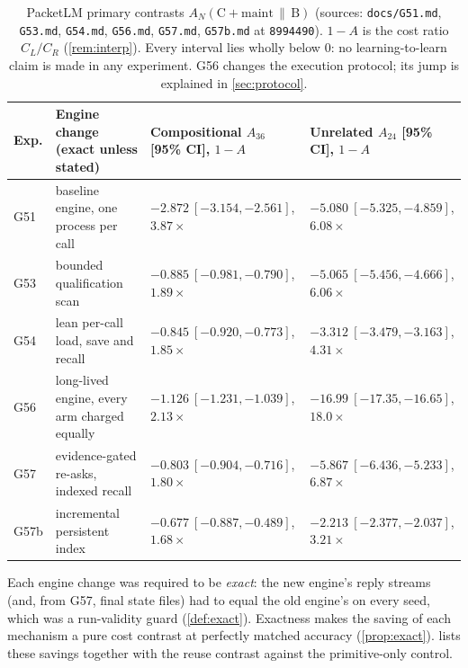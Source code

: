 \documentclass[11pt]{article}
\theoremstyle{remark}
\begin{document}
\begin{table}[ht]
\centering\small
\begin{tabularx}{\linewidth}{@{}l>{\raggedright\arraybackslash}Xll@{}}
\toprule
Exp. & Engine change (exact unless stated) & Compositional $A_{36}$ [95\% CI], $1-A$ & Unrelated $A_{24}$ [95\% CI], $1-A$\\
\midrule
G51 & baseline engine, one process per call & $-2.872\ [-3.154,-2.561]$, $3.87\times$ & $-5.080\ [-5.325,-4.859]$, $6.08\times$\\
G53 & bounded qualification scan & $-0.885\ [-0.981,-0.790]$, $1.89\times$ & $-5.065\ [-5.456,-4.666]$, $6.06\times$\\
G54 & lean per-call load, save and recall & $-0.845\ [-0.920,-0.773]$, $1.85\times$ & $-3.312\ [-3.479,-3.163]$, $4.31\times$\\
G56 & long-lived engine, every arm charged equally & $-1.126\ [-1.231,-1.039]$, $2.13\times$ & $-16.99\ [-17.35,-16.65]$, $18.0\times$\\
G57 & evidence-gated re-asks, indexed recall & $-0.803\ [-0.904,-0.716]$, $1.80\times$ & $-5.867\ [-6.436,-5.233]$, $6.87\times$\\
G57b & incremental persistent index & $-0.677\ [-0.887,-0.489]$, $1.68\times$ & $-2.213\ [-2.377,-2.037]$, $3.21\times$\\
\bottomrule
\end{tabularx}
\caption{PacketLM primary contrasts $A_N(\text{C}{+}\text{maint}\,\|\,\text{B})$ (sources: \texttt{docs/G51.md}, \texttt{G53.md}, \texttt{G54.md}, \texttt{G56.md}, \texttt{G57.md}, \texttt{G57b.md} at \texttt{8994490}). $1-A$ is the cost ratio $C_L/C_R$ (\cref{rem:interp}). Every interval lies wholly below $0$: no learning-to-learn claim is made in any experiment. G56 changes the execution protocol; its jump is explained in \cref{sec:protocol}.}
\label{tab:pl-seq}
\end{table}

Each engine change was required to be \emph{exact}: the new engine's reply streams (and, from G57, final state files) had to equal the old engine's on every seed, which was a run-validity guard (\cref{def:exact}). Exactness makes the saving of each mechanism a pure cost contrast at perfectly matched accuracy (\cref{prop:exact}).  lists these savings together with the reuse contrast against the primitive-only control.
\end{document}
